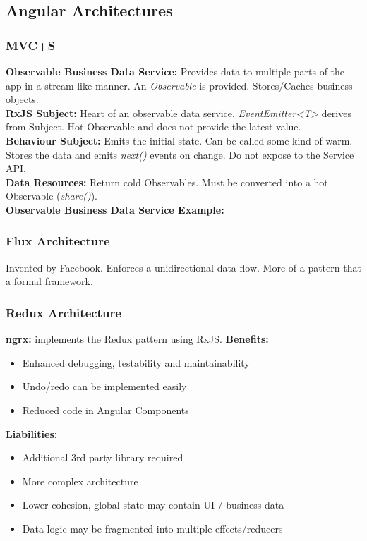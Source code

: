 \subsection{Angular Architectures}
\subsubsection{MVC+S}
\textbf{Observable Business Data Service:} Provides data to multiple parts of the app in a stream-like manner.
An \textit{Observable} is provided.
Stores/Caches business objects.\\
\textbf{RxJS Subject:} Heart of an observable data service. \textit{EventEmitter<T>} derives from Subject.
Hot Observable and does not provide the latest value.\\
\textbf{Behaviour Subject:} Emits the initial state.
Can be called some kind of warm.
Stores the data and emits \textit{next()} events on change.
Do not expose to the Service API.\\
\textbf{Data Resources:} Return cold Observables.
Must be converted into a hot Observable (\textit{share()}).\\
\textbf{Observable Business Data Service Example:}

\subsubsection{Flux Architecture}
Invented by Facebook.
Enforces a unidirectional data flow.
More of a pattern that a formal framework.

\subsubsection{Redux Architecture}
\textbf{ngrx:} implements the Redux pattern using RxJS.
\textbf{Benefits:}
\begin{itemize}
    \item Enhanced debugging, testability and maintainability
    \item Undo/redo can be implemented easily
    \item Reduced code in Angular Components
\end{itemize}
\textbf{Liabilities:}
\begin{itemize}
    \item Additional 3rd party library required
    \item More complex architecture
    \item Lower cohesion, global state may contain UI / business data
    \item Data logic may be fragmented into multiple effects/reducers
\end{itemize}

